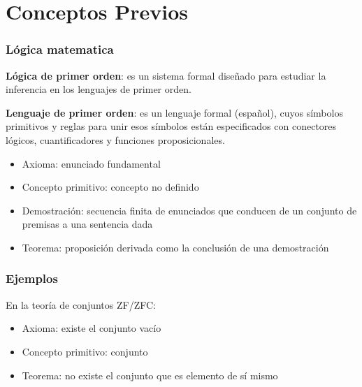 \section{Conceptos Previos} 

\begin{frame}
\frametitle{Lógica matematica}

\textbf{Lógica de primer orden}: es un sistema formal diseñado para estudiar la inferencia en los lenguajes de primer orden. 

\textbf{Lenguaje de primer orden}: es un lenguaje formal (español), cuyos símbolos primitivos y reglas para unir esos símbolos están especificados con conectores lógicos, cuantificadores y funciones proposicionales. %

\pause
\begin{itemize}
 \item Axioma: enunciado fundamental
 \item Concepto primitivo: concepto no definido
 \item Demostración: secuencia finita de enunciados que conducen de un conjunto de premisas a una sentencia dada
 \item Teorema: proposición derivada como la conclusión de una demostración
\end{itemize}
\end{frame}

\begin{frame}
\frametitle{Ejemplos}

 En la teoría de conjuntos ZF/ZFC:
\begin{itemize}
 \item Axioma: existe el conjunto vacío 
 \item Concepto primitivo: conjunto 
 \item Teorema: no existe el conjunto que es elemento de sí mismo 
\end{itemize}

\end{frame}



